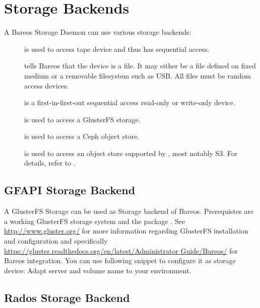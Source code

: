 \chapter{Storage Backends}

A Bareos Storage Daemon can use various storage backends:

\begin{description}
\item [] is used to access tape device and thus has sequential access.
\item []
  tells Bareos that the device is a file. It may either be a
  file defined on fixed medium or a removable filesystem such as
  USB.  All files must be random access devices.
\item [] is a first-in-first-out sequential access read-only
  or write-only device.
\item [] is used to access a GlusterFS storage.
\item [] is used to access a Ceph object store.
\item [] is used to access an object store supported by , most notably S3.
  For details, refer to .
\end{description}





\section{GFAPI Storage Backend}
\label{SdBackendGfapi}


A GlusterFS Storage can be used as Storage backend of Bareos.
Prerequistes are a working GlusterFS storage system and the package .
See \url{http://www.gluster.org/} for more information regarding GlusterFS installation and configuration
and specifically \url{https://gluster.readthedocs.org/en/latest/Administrator Guide/Bareos/}
for Bareos integration.
You can use following snippet to configure it as storage device:
Adapt server and volume name to your environment.




\section{Rados Storage Backend}
\label{SdBackendRados}


